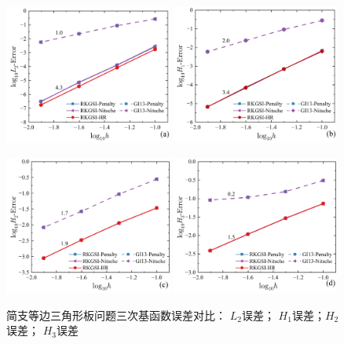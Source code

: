 \begin{figure}[H]
    \centering
    \begin{subcaptiongroup}
    \includegraphics[width=0.49\textwidth]{figure/PHR/T/CL2.png}
    \label{CL2}
    \includegraphics[width=0.49\textwidth]{figure/PHR/T/CH1.png}
    \label{CH1}
    \end{subcaptiongroup}
    \begin{subcaptiongroup}
    \includegraphics[width=0.49\textwidth]{figure/PHR/T/CH2.png}
    \label{CH2}
    \includegraphics[width=0.49\textwidth]{figure/PHR/T/CH3.png}
    \label{CH3}
    \end{subcaptiongroup}
\caption{简支等边三角形板问题三次基函数误差对比： $L_2$误差； $H_1$误差；$H_2$误差； $H_3$误差}
\label{TCLH}
\end{figure}
